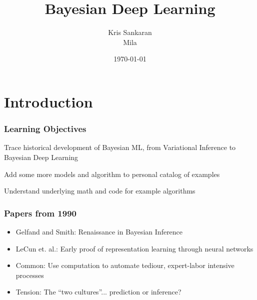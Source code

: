 \documentclass[10pt,mathserif]{beamer}
\title{\large \bfseries Bayesian Deep Learning}
\author{Kris Sankaran\\[3ex] Mila}
\date{\today}
\begin{document}
\maketitle

\section{Introduction}
\label{sec:introduction}

\begin{frame}
  \frametitle{Learning Objectives}
 \item Trace historical development of Bayesian ML, from Variational Inference
   to Bayesian Deep Learning
 \item Add some more models and algorithm to personal catalog of examples
 \item Understand underlying math and code for example algorithms
\end{frame}

\begin{frame}
  \frametitle{Papers from 1990}
  \begin{itemize}
  \item Gelfand and Smith: Renaissance in Bayesian Inference
  \item LeCun et. al.: Early proof of representation learning through neural networks
  \item Common: Use computation to automate tediour, expert-labor intensive processes
  \item Tension: The ``two cultures''... prediction or inference?
  \end{itemize}
  \begin{figure}
  \end{figure}
\end{frame}
\end{document}
